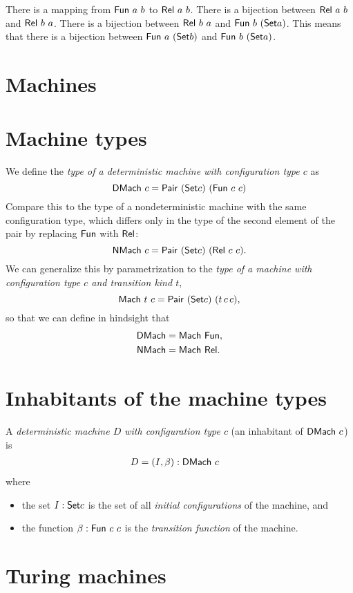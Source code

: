 There is a mapping from $\mathsf{Fun}~a~b$ to $\mathsf{Rel}~a~b$.
There is a bijection between $\mathsf{Rel}~a~b$ and $\mathsf{Rel}~b~a$.
There is a bijection between $\mathsf{Rel}~b~a$ and $\mathsf{Fun}~b~(\textsf{Set}{a})$.
This means that there is a bijection between $\mathsf{Fun}~a~(\textsf{Set}{b})$ and $\mathsf{Fun}~b~(\textsf{Set}{a})$.

\section{Machines}

\section{Machine types}

We define the \emph{type of a deterministic machine with configuration type $c$} as
\[ \mathsf{DMach}~c = \mathsf{Pair}~(\textsf{Set}{c})~(\mathsf{Fun}~c~c) \]
Compare this to the type of a nondeterministic machine
with the same configuration type,
which differs only in the type of the second element of the pair
by replacing $\mathsf{Fun}$ with $\mathsf{Rel}$:
\[ \mathsf{NMach}~c = \mathsf{Pair}~(\textsf{Set}{c})~(\mathsf{Rel}~c~c). \]
We can generalize this by parametrization to
the \emph{type of a machine with configuration type $c$
and transition kind $t$},
\[
    \mathsf{Mach}~t~c = \mathsf{Pair}~(\textsf{Set}{c})~(t\,c\,c),
\]
so that we can define in hindsight that
\begin{align*}
       \mathsf{DMach} &= \mathsf{Mach}~\mathsf{Fun},
    \\
       \mathsf{NMach} &= \mathsf{Mach}~\mathsf{Rel}.
\end{align*}

\section{Inhabitants of the machine types}

A \emph{deterministic machine $D$ with configuration type $c$}
(an inhabitant of $\mathsf{DMach}~c$) is
\begin{align*}
    D &= (I,\beta) : \mathsf{DMach}~c
\end{align*}
where
\begin{itemize}
    \item the set $I : \textsf{Set}{c}$ is the set of all \emph{initial configurations} of the machine, and
    \item the function $\beta : \mathsf{Fun}~c~c$ is the \emph{transition function} of the machine.
\end{itemize}

\section{Turing machines}

